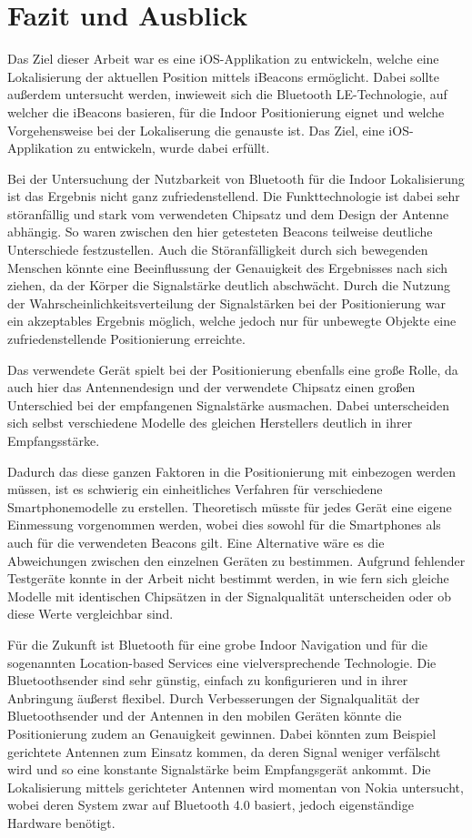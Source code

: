 \chapter{Fazit und Ausblick}
\label{chap:resume}

Das Ziel dieser Arbeit war es eine iOS-Applikation zu entwickeln, welche eine Lokalisierung der aktuellen Position mittels iBeacons ermöglicht. Dabei sollte außerdem untersucht werden, inwieweit sich die Bluetooth LE-Technologie, auf welcher die iBeacons basieren, für die Indoor Positionierung eignet und welche Vorgehensweise bei der Lokaliserung die genauste ist. Das Ziel, eine iOS-Applikation zu entwickeln, wurde dabei erfüllt. 

Bei der Untersuchung der Nutzbarkeit von Bluetooth für die Indoor Lokalisierung ist das Ergebnis nicht ganz zufriedenstellend. Die Funkttechnologie ist dabei sehr störanfällig und stark vom verwendeten Chipsatz und dem Design der Antenne abhängig. So waren zwischen den hier getesteten Beacons teilweise deutliche Unterschiede festzustellen. Auch die Störanfälligkeit durch sich bewegenden Menschen könnte eine Beeinflussung der Genauigkeit des Ergebnisses nach sich ziehen, da der Körper die Signalstärke deutlich abschwächt. Durch die Nutzung der Wahrscheinlichkeitsverteilung der Signalstärken bei der Positionierung war ein akzeptables Ergebnis möglich, welche jedoch nur für unbewegte Objekte eine zufriedenstellende Positionierung erreichte.

Das verwendete Gerät spielt bei der Positionierung ebenfalls eine große Rolle, da auch hier das Antennendesign und der verwendete Chipsatz einen großen Unterschied bei der empfangenen Signalstärke ausmachen. Dabei unterscheiden sich selbst verschiedene Modelle des gleichen Herstellers deutlich in ihrer Empfangsstärke. 

Dadurch das diese ganzen Faktoren in die Positionierung mit einbezogen werden müssen, ist es schwierig ein einheitliches Verfahren für verschiedene Smartphonemodelle zu erstellen. Theoretisch müsste für jedes Gerät eine eigene Einmessung vorgenommen werden, wobei dies sowohl für die Smartphones als auch für die verwendeten Beacons gilt.
Eine Alternative wäre es die Abweichungen zwischen den einzelnen Geräten zu bestimmen. Aufgrund fehlender Testgeräte konnte in der Arbeit nicht bestimmt werden, in wie fern sich gleiche Modelle mit identischen Chipsätzen in der Signalqualität unterscheiden oder ob diese Werte vergleichbar sind.

Für die Zukunft ist Bluetooth für eine grobe Indoor Navigation und für die sogenannten Location-based Services eine vielversprechende Technologie. Die Bluetoothsender sind sehr günstig, einfach zu konfigurieren und in ihrer Anbringung äußerst flexibel. Durch Verbesserungen der Signalqualität der Bluetoothsender und der Antennen in den mobilen Geräten könnte die Positionierung zudem an Genauigkeit gewinnen. Dabei könnten zum Beispiel gerichtete Antennen zum Einsatz kommen, da deren Signal weniger verfälscht wird und so eine konstante Signalstärke beim Empfangsgerät ankommt. Die Lokalisierung mittels gerichteter Antennen wird momentan von Nokia untersucht, wobei deren System zwar auf Bluetooth 4.0 basiert, jedoch eigenständige Hardware benötigt.

